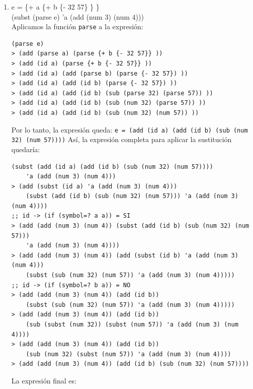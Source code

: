 \documentclass[11pt]{article}
\begin{document}
\begin{enumerate}[leftmargin=0.8cm]
\begin{enumerate}
\begin{lstlisting}
    {sub (num 30) {add (id y) (id z)}})
> (with (y (sub (num 30) (sub (subst (id y) 'y (id 'w))
    (subst (id z) 'y (id 'w)))))
    {sub (num 30) {add (id y) (id z)}})
;; id -> (if (symbol=? y y)) = SI
> (with (y (sub (num 30) (sub (id w) (subst (id z) 'y (id 'w)))))
    {sub (num 30) {add (id y) (id z)}})
;; id -> (if (symbol=? z y)) = NO
> (with (y (sub (num 30) (sub (id w) (id z))))
    (sub (num 30) (add (id y) (id z))))
        \end{lstlisting}
        La expresión final es:\\

        \item[b.] e = \{+ a \{+ b \{- 32 57\} \} \}\\
        (subst (parse e) 'a (add (num 3) (num 4)))\\
        Aplicamos la función \texttt{parse} a la expresión:
        \begin{lstlisting}
(parse e)
> (add (parse a) (parse {+ b {- 32 57}} ))
> (add (id a) (parse {+ b {- 32 57}} ))
> (add (id a) (add (parse b) (parse {- 32 57}) ))
> (add (id a) (add (id b) (parse {- 32 57}) ))
> (add (id a) (add (id b) (sub (parse 32) (parse 57)) ))
> (add (id a) (add (id b) (sub (num 32) (parse 57)) ))
> (add (id a) (add (id b) (sub (num 32) (num 57)) ))
        \end{lstlisting}
        Por lo tanto, la expresión queda:
        \texttt{e = (add (id a) (add (id b) (sub (num 32) (num 57))))}
        Así, la expresión completa para aplicar la sustitución quedaría:
        \begin{lstlisting}
(subst (add (id a) (add (id b) (sub (num 32) (num 57))))
    'a (add (num 3) (num 4)))
> (add (subst (id a) 'a (add (num 3) (num 4)))
    (subst (add (id b) (sub (num 32) (num 57))) 'a (add (num 3) (num 4))))
;; id -> (if (symbol=? a a)) = SI
> (add (add (num 3) (num 4)) (subst (add (id b) (sub (num 32) (num 57)))
    'a (add (num 3) (num 4))))
> (add (add (num 3) (num 4)) (add (subst (id b) 'a (add (num 3) (num 4)))
    (subst (sub (num 32) (num 57)) 'a (add (num 3) (num 4)))))
;; id -> (if (symbol=? b a)) = NO
> (add (add (num 3) (num 4)) (add (id b))
    (subst (sub (num 32) (num 57)) 'a (add (num 3) (num 4)))))
> (add (add (num 3) (num 4)) (add (id b))
    (sub (subst (num 32)) (subst (num 57)) 'a (add (num 3) (num 4))))
> (add (add (num 3) (num 4)) (add (id b))
    (sub (num 32) (subst (num 57)) 'a (add (num 3) (num 4))))
> (add (add (num 3) (num 4)) (add (id b) (sub (num 32) (num 57))))
        \end{lstlisting}
        La expresión final es:\\
    \end{enumerate}
\newpage


\end{enumerate}
\end{document}
